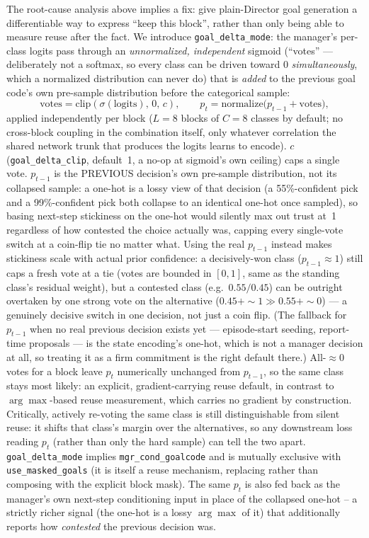 \documentclass[10pt]{article}
\begin{document}
The root-cause analysis above implies a fix: give plain-Director goal
generation a differentiable way to express ``keep this block'', rather than
only being able to measure reuse after the fact. We introduce
\texttt{goal\_delta\_mode}: the manager's per-class logits pass through an
\emph{unnormalized, independent} sigmoid (``votes'' --- deliberately not a
softmax, so every class can be driven toward 0 \emph{simultaneously}, which a
normalized distribution can never do) that is \emph{added} to the previous
goal code's own pre-sample distribution before the categorical sample:
\begin{equation}
  \text{votes} = \mathrm{clip}(\sigma(\text{logits}),\,0,\,c), \qquad
  p_t = \mathrm{normalize}\!\big(p_{t-1} + \text{votes}\big),
\label{eq:delta}
\end{equation}
applied independently per block ($L{=}8$ blocks of $C{=}8$ classes by
default; no cross-block coupling in the combination itself, only whatever
correlation the shared network trunk that produces the logits learns to
encode). $c$ (\texttt{goal\_delta\_clip}, default~1, a no-op at sigmoid's own
ceiling) caps a single vote. $p_{t-1}$ is the PREVIOUS decision's own
pre-sample distribution, not its collapsed sample: a one-hot is a lossy view
of that decision (a 55\%-confident pick and a 99\%-confident pick both
collapse to an identical one-hot once sampled), so basing next-step
stickiness on the one-hot would silently max out trust at~1 regardless of
how contested the choice actually was, capping every single-vote switch at a
coin-flip tie no matter what. Using the real $p_{t-1}$ instead makes
stickiness scale with actual prior confidence: a decisively-won class
($p_{t-1}\!\approx\!1$) still caps a fresh vote at a tie (votes are bounded
in $[0,1]$, same as the standing class's residual weight), but a contested
class (e.g.\ $0.55/0.45$) can be outright overtaken by one strong vote on the
alternative ($0.45+{\sim}1 \gg 0.55+{\sim}0$) --- a genuinely decisive switch
in one decision, not just a coin flip. (The fallback for $p_{t-1}$ when no
real previous decision exists yet --- episode-start seeding, report-time
proposals --- is the state encoding's one-hot, which is not a manager
decision at all, so treating it as a firm commitment is the right default
there.) All-$\approx\!0$ votes for a block leave $p_t$ numerically unchanged
from $p_{t-1}$, so the same class stays most likely: an explicit,
gradient-carrying reuse default, in contrast to $\arg\max$-based reuse
measurement, which carries no gradient by construction. Critically, actively
re-voting the same class is still distinguishable from silent reuse: it
shifts that class's margin over the alternatives, so any downstream loss
reading $p_t$ (rather than only the hard sample) can tell the two apart.
\texttt{goal\_delta\_mode} implies \texttt{mgr\_cond\_goalcode} and is
mutually exclusive with \texttt{use\_masked\_goals} (it is itself a reuse
mechanism, replacing rather than composing with the explicit block mask). The
same $p_t$ is also fed back as the manager's own next-step conditioning
input in place of the collapsed one-hot -- a strictly richer signal (the
one-hot is a lossy $\arg\max$ of it) that additionally reports how
\emph{contested} the previous decision was.
\end{document}
